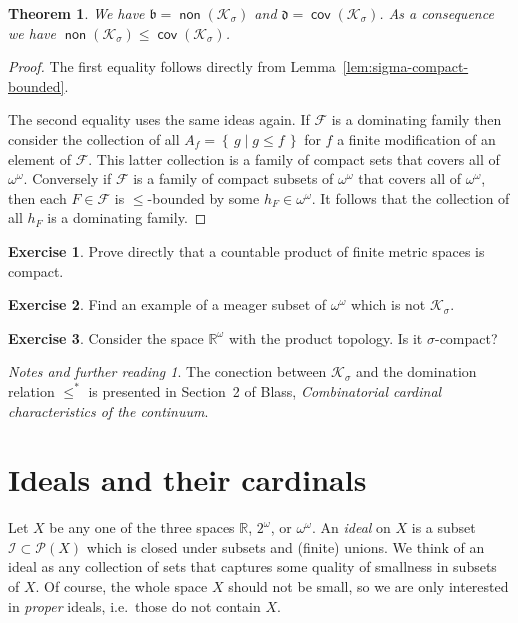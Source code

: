 \documentclass[11pt,oneside,a4paper]{amsbook}
\newcommand{\set}[1]{\left\{\,#1\,\right\}}
\newcommand{\R}{\mathbb R}
\newcommand{\Ksigma}{\mathcal K_\sigma}
\DeclareMathOperator{\non}{\mathsf{non}}
\DeclareMathOperator{\cov}{\mathsf{cov}}
\theoremstyle{definition}
\newtheorem{exercise}{Exercise}[section]
\theoremstyle{plain}
\newtheorem{theorem}{Theorem}[section]
\theoremstyle{definition}
\theoremstyle{remark}
\newtheorem*{notes}{Notes and further reading}
\numberwithin{equation}{section}
\numberwithin{figure}{section}
\begin{document}
\begin{theorem}
  \label{thm:bd-vs-ksigma}
  We have $\mathfrak b=\non(\Ksigma)$ and $\mathfrak d=\cov(\Ksigma)$. As a consequence we have $\non(\Ksigma)\leq\cov(\Ksigma)$.
\end{theorem}

\begin{proof}
  The first equality follows directly from Lemma~\ref{lem:sigma-compact-bounded}.

  The second equality uses the same ideas again. If $\mathcal F$ is a dominating family then consider the collection of all $A_f=\set{g\mid g\leq f}$ for $f$ a finite modification of an element of $\mathcal F$. This latter collection is a family of compact sets that covers all of $\omega^\omega$. Conversely if $\mathcal F$ is a family of compact subsets of $\omega^\omega$ that covers all of $\omega^\omega$, then each $F\in\mathcal F$ is $\leq$-bounded by some $h_F\in\omega^\omega$. It follows that the collection of all $h_F$ is a dominating family.
\end{proof}

\begin{exercise}
  Prove directly that a countable product of finite metric spaces is compact.
\end{exercise}

\begin{exercise}
  Find an example of a meager subset of $\omega^\omega$ which is not $\Ksigma$.
\end{exercise}

\begin{exercise}
  Consider the space $\R^\omega$ with the product topology. Is it $\sigma$-compact?
\end{exercise}

\begin{notes}
  The conection between $\mathcal K_\sigma$ and the domination relation $\leq^*$ is presented in Section~2 of Blass, \emph{Combinatorial cardinal characteristics of the continuum}.
\end{notes}


\newpage
\section{Ideals and their cardinals}

Let $X$ be any one of the three spaces $\R$, $2^\omega$, or $\omega^\omega$. An \emph{ideal} on $X$ is a subset $\mathcal I\subset\mathcal P(X)$ which is closed under subsets and (finite) unions. We think of an ideal as any collection of sets that captures some quality of smallness in subsets of $X$. Of course, the whole space $X$ should not be small, so we are only interested in \emph{proper} ideals, i.e.\ those do not contain $X$.
\end{document}
